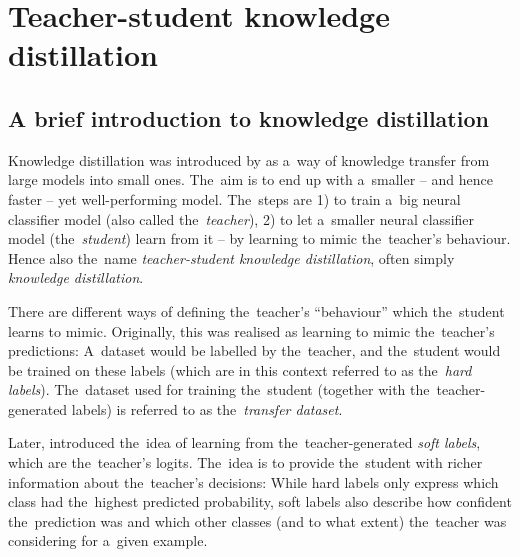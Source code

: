 \documentclass[bsc,frontabs,singlespacing,parskip,deptreport]{infthesis}
\begin{document}
{  \section{Teacher-student knowledge distillation}{
    \label{sec:KD}
    \subsection{A brief introduction to knowledge distillation}{
      \label{sec:KD-intro}
      Knowledge distillation was introduced by \citet{Bucila_2006} as a~way of knowledge transfer from large models into small ones. The~aim is to end up with a~smaller -- and hence faster -- yet well-performing model. The~steps are 1) to train a~big neural classifier model (also called the~\textit{teacher}), 2) to let a~smaller neural classifier model (the~\textit{student}) learn from it -- by learning to mimic the~teacher's behaviour. Hence also the~name \textit{teacher-student knowledge distillation}, often simply \textit{knowledge distillation}.
      
      There are different ways of defining the~teacher's ``behaviour'' which the~student learns to mimic. Originally, this was realised as learning to mimic the~teacher's predictions: A~dataset would be labelled by the~teacher, and the~student would be trained on these labels (which are in this context referred to as the~\textit{hard labels}). The~dataset used for training the~student (together with the~teacher-generated labels) is referred to as the~\textit{transfer dataset}.

      Later, \citet{Ba_2013} introduced the~idea of learning from the~teacher-generated \textit{soft labels}, which are the~teacher's logits. The~idea is to provide the~student with richer information about the~teacher's decisions: While hard labels only express which class had the~highest predicted probability, soft labels also describe how confident the~prediction was and which other classes (and to what extent) the~teacher was considering for a~given example.

}}}
\end{document}
